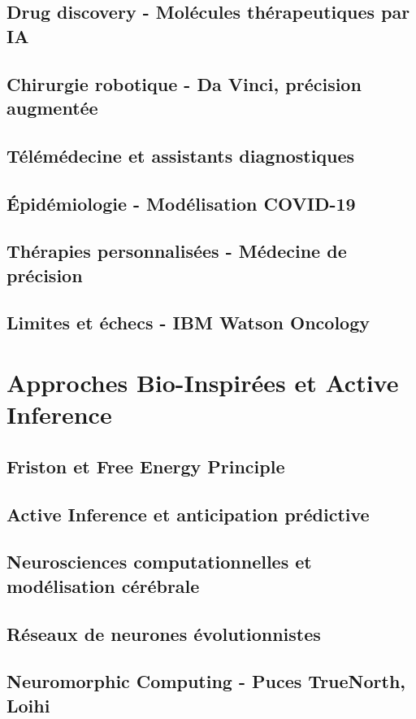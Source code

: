 \documentclass[12pt,a4paper]{book}
\begin{document}
\section{Drug discovery - Molécules thérapeutiques par IA}
\section{Chirurgie robotique - Da Vinci, précision augmentée}
\section{Télémédecine et assistants diagnostiques}
\section{Épidémiologie - Modélisation COVID-19}
\section{Thérapies personnalisées - Médecine de précision}
\section{Limites et échecs - IBM Watson Oncology}

\chapter{Approches Bio-Inspirées et Active Inference}
\section{Friston et Free Energy Principle}
\section{Active Inference et anticipation prédictive}
\section{Neurosciences computationnelles et modélisation cérébrale}
\section{Réseaux de neurones évolutionnistes}
\section{Neuromorphic Computing - Puces TrueNorth, Loihi}
\end{document}
